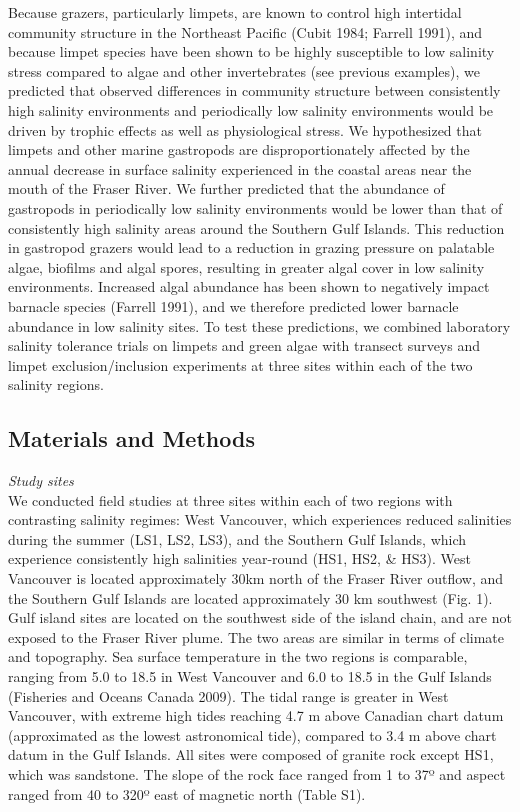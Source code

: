 \documentclass[
  11pt,
]{article}
\begin{document}
Because grazers, particularly limpets, are known to control high intertidal community structure in the Northeast Pacific (Cubit 1984; Farrell 1991), and because limpet species have been shown to be highly susceptible to low salinity stress compared to algae and other invertebrates (see previous examples), we predicted that observed differences in community structure between consistently high salinity environments and periodically low salinity environments would be driven by trophic effects as well as physiological stress. We hypothesized that limpets and other marine gastropods are disproportionately affected by the annual decrease in surface salinity experienced in the coastal areas near the mouth of the Fraser River. We further predicted that the abundance of gastropods in periodically low salinity environments would be lower than that of consistently high salinity areas around the Southern Gulf Islands. This reduction in gastropod grazers would lead to a reduction in grazing pressure on palatable algae, biofilms and algal spores, resulting in greater algal cover in low salinity environments. Increased algal abundance has been shown to negatively impact barnacle species (Farrell 1991), and we therefore predicted lower barnacle abundance in low salinity sites. To test these predictions, we combined laboratory salinity tolerance trials on limpets and green algae with transect surveys and limpet exclusion/inclusion experiments at three sites within each of the two salinity regions.

\hypertarget{materials-and-methods}{%
\subsection{Materials and Methods}\label{materials-and-methods}}

\emph{Study sites}\\
We conducted field studies at three sites within each of two regions with contrasting salinity regimes: West Vancouver, which experiences reduced salinities during the summer (LS1, LS2, LS3), and the Southern Gulf Islands, which experience consistently high salinities year-round (HS1, HS2, \& HS3). West Vancouver is located approximately 30km north of the Fraser River outflow, and the Southern Gulf Islands are located approximately 30 km southwest (Fig. 1). Gulf island sites are located on the southwest side of the island chain, and are not exposed to the Fraser River plume. The two areas are similar in terms of climate and topography. Sea surface temperature in the two regions is comparable, ranging from 5.0 to 18.5 in West Vancouver and 6.0 to 18.5 in the Gulf Islands (Fisheries and Oceans Canada 2009). The tidal range is greater in West Vancouver, with extreme high tides reaching 4.7 m above Canadian chart datum (approximated as the lowest astronomical tide), compared to 3.4 m above chart datum in the Gulf Islands. All sites were composed of granite rock except HS1, which was sandstone. The slope of the rock face ranged from 1 to 37º and aspect ranged from 40 to 320º east of magnetic north (Table S1).
\end{document}

